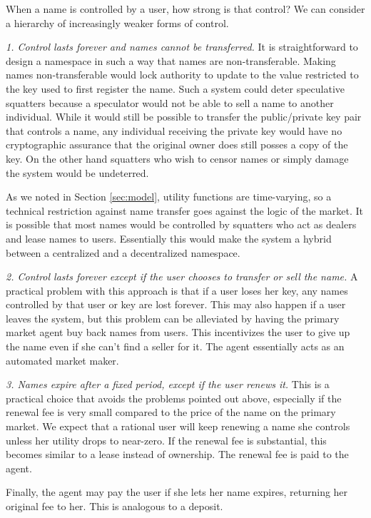 When a name is controlled by a user, how strong is that control? We can consider a hierarchy of increasingly weaker forms of control.

{\em 1. Control lasts forever and names cannot be transferred.} It is straightforward to design a namespace in such a way that names are non-transferable. Making names non-transferable would lock authority to update to the value restricted to the key used to first register the name. Such a system could deter speculative squatters because a speculator would not be able to sell a name to another individual. While it would still be possible to transfer the public/private key pair that controls a name, any individual receiving the private key would have no cryptographic assurance that the original owner does still posses a copy of the key. On the other hand squatters who wish to censor names or simply damage the system would be undeterred.

As we noted in Section \ref{sec:model}, utility functions are time-varying, so a technical restriction against name transfer goes against the logic of the market. It is possible that most names would be controlled by squatters who act as dealers and lease names to users. Essentially this would make the system a hybrid between a centralized and a decentralized namespace.


{\em 2. Control lasts forever except if the user chooses to transfer or sell the name.} A practical problem with this approach is that if a user loses her key, any names controlled by that user or key are lost forever. This may also happen if a user leaves the system, but this problem can be alleviated by having the primary market agent buy back names from users. This incentivizes the user to give up the name even if she can't find a seller for it. The agent essentially acts as an automated market maker.

{\em 3. Names expire after a fixed period, except if the user renews it.} This is a practical choice that avoids the problems pointed out above, especially if the renewal fee is very small compared to the price of the name on the primary market. We expect that a rational user will keep renewing a name she controls unless her utility drops to near-zero.
If the renewal fee is substantial, this becomes similar to a lease instead of ownership. The renewal fee is paid to the agent. 

Finally, the agent may pay the user if she lets her name expires, returning her original fee to her. This is analogous to a deposit.

